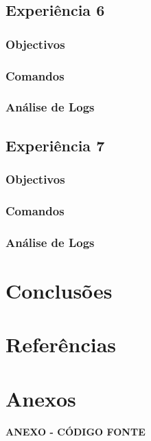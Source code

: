 \documentclass[a4paper,11pt]{article}
\begin{document}
\subsection{Experiência 6}
\subsubsection{Objectivos}

\subsubsection{Comandos}

\subsubsection{Análise de Logs}

\subsection{Experiência 7}
\subsubsection{Objectivos}

\subsubsection{Comandos}

\subsubsection{Análise de Logs}

\section{Conclusões}

\section{Referências}

\section{Anexos}

\lstset{showstringspaces=false,
		frame=tb,
		caption=WireShark Exp 1 - PC 1 }

\newpage

\vspace*{\fill} 
\centering
\begin{Huge}\textbf{ANEXO - CÓDIGO FONTE}\end{Huge}
\vspace*{\fill}
\thispagestyle{empty}
\setcounter{page}{1}
\end{document}
